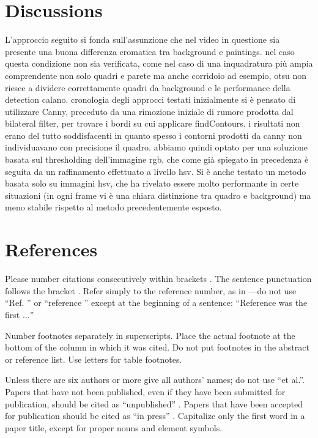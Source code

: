 \documentclass[conference]{IEEEtran}
\begin{document}
\section*{Discussions}
L’approccio seguito si fonda sull’assunzione che nel video in questione sia presente una buona differenza cromatica tra background e paintings. nel caso questa condizione non sia verificata, come nel caso di una inquadratura più ampia comprendente non solo quadri e parete ma anche corridoio ad esempio, otsu non riesce a dividere correttamente quadri da background e le performance della detection calano.
cronologia degli approcci testati
inizialmente si è pensato di utilizzare Canny, preceduto da una rimozione iniziale di rumore prodotta dal bilateral filter, per trovare i bordi su cui applicare findContours. i risultati non erano del tutto soddisfacenti in quanto spesso i contorni prodotti da canny non individuavano con precisione il quadro. abbiamo quindi optato per una soluzione basata sul thresholding dell’immagine rgb, che come già spiegato in precedenza è seguita da un raffinamento effettuato a livello hsv. Si è anche testato un metodo basata solo su immagini hsv, che ha rivelato essere molto performante in certe situazioni (in ogni frame vi è una chiara distinzione tra quadro e background) ma meno stabile rispetto al metodo precedentemente esposto.


\section*{References}
Please number citations consecutively within brackets \cite{b1}. The 
sentence punctuation follows the bracket \cite{b2}. Refer simply to the reference 
number, as in \cite{b3}---do not use ``Ref. \cite{b3}'' or ``reference \cite{b3}'' except at 
the beginning of a sentence: ``Reference \cite{b3} was the first $\ldots$''

Number footnotes separately in superscripts. Place the actual footnote at 
the bottom of the column in which it was cited. Do not put footnotes in the 
abstract or reference list. Use letters for table footnotes.

Unless there are six authors or more give all authors' names; do not use 
``et al.''. Papers that have not been published, even if they have been 
submitted for publication, should be cited as ``unpublished'' \cite{b4}. Papers 
that have been accepted for publication should be cited as ``in press'' \cite{b5}. 
Capitalize only the first word in a paper title, except for proper nouns and 
element symbols.
\end{document}
